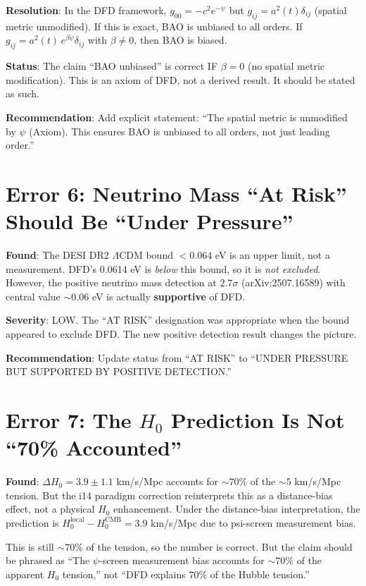 \documentclass[11pt,a4paper]{article}
\begin{document}
\textbf{Resolution}: In the DFD framework, $g_{00} = -c^2 e^{-\psi}$ but $g_{ij} = a^2(t)\delta_{ij}$ (spatial metric unmodified). If this is exact, BAO is unbiased to all orders. If $g_{ij} = a^2(t)\,e^{\beta\psi}\delta_{ij}$ with $\beta \neq 0$, then BAO is biased.

\textbf{Status}: The claim ``BAO unbiased'' is correct IF $\beta = 0$ (no spatial metric modification). This is an axiom of DFD, not a derived result. It should be stated as such.

\textbf{Recommendation}: Add explicit statement: ``The spatial metric is unmodified by $\psi$ (Axiom). This ensures BAO is unbiased to all orders, not just leading order.''

\section{Error 6: Neutrino Mass ``At Risk'' Should Be ``Under Pressure''}

\textbf{Found}: The DESI DR2 $\Lambda$CDM bound $< 0.064$ eV is an upper limit, not a measurement. DFD's 0.0614 eV is \emph{below} this bound, so it is \emph{not excluded}. However, the positive neutrino mass detection at $2.7\sigma$ (arXiv:2507.16589) with central value $\sim 0.06$ eV is actually \textbf{supportive} of DFD.

\textbf{Severity}: LOW. The ``AT RISK'' designation was appropriate when the bound appeared to exclude DFD. The new positive detection result changes the picture.

\textbf{Recommendation}: Update status from ``AT RISK'' to ``UNDER PRESSURE BUT SUPPORTED BY POSITIVE DETECTION.''

\section{Error 7: The $H_0$ Prediction Is Not ``70\% Accounted''}

\textbf{Found}: $\Delta H_0 = 3.9 \pm 1.1$ km/s/Mpc accounts for $\sim 70\%$ of the $\sim 5$ km/s/Mpc tension. But the i14 paradigm correction reinterprets this as a distance-bias effect, not a physical $H_0$ enhancement. Under the distance-bias interpretation, the prediction is $H_0^{\mathrm{local}} - H_0^{\mathrm{CMB}} = 3.9$ km/s/Mpc due to psi-screen measurement bias.

This is still $\sim 70\%$ of the tension, so the number is correct. But the claim should be phrased as ``The $\psi$-screen measurement bias accounts for $\sim 70\%$ of the apparent $H_0$ tension,'' not ``DFD explains 70\% of the Hubble tension.''
\end{document}
